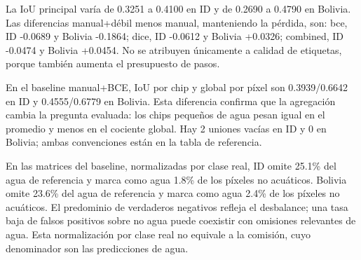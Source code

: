 La IoU principal varía de 0.3251 a 0.4100 en ID y de 0.2690 a 0.4790 en Bolivia. Las diferencias manual+débil menos manual, manteniendo la pérdida, son: bce, ID -0.0689 y Bolivia -0.1864; dice, ID -0.0612 y Bolivia +0.0326; combined, ID -0.0474 y Bolivia +0.0454. No se atribuyen únicamente a calidad de etiquetas, porque también aumenta el presupuesto de pasos.

En el baseline manual+BCE, IoU por chip y global por píxel son 0.3939/0.6642 en ID y 0.4555/0.6779 en Bolivia. Esta diferencia confirma que la agregación cambia la pregunta evaluada: los chips pequeños de agua pesan igual en el promedio y menos en el cociente global. Hay 2 uniones vacías en ID y 0 en Bolivia; ambas convenciones están en la tabla de referencia.

En las matrices del baseline, normalizadas por clase real, ID omite 25.1\% del agua de referencia y marca como agua 1.8\% de los píxeles no acuáticos. Bolivia omite 23.6\% del agua de referencia y marca como agua 2.4\% de los píxeles no acuáticos. El predominio de verdaderos negativos refleja el desbalance; una tasa baja de falsos positivos sobre no agua puede coexistir con omisiones relevantes de agua. Esta normalización por clase real no equivale a la comisión, cuyo denominador son las predicciones de agua.